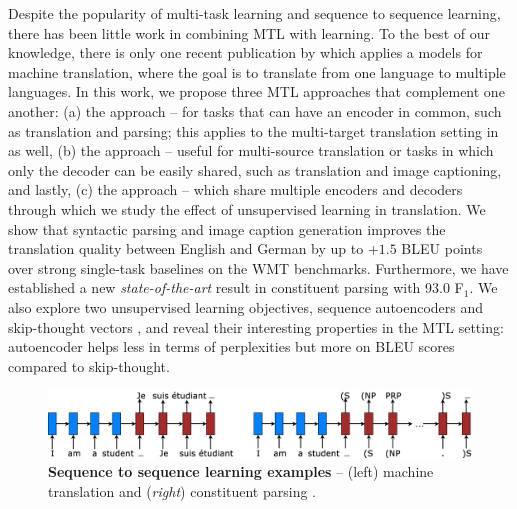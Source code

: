 Despite the popularity of multi-task learning and sequence to sequence
learning, there has been little work in combining MTL with \ssl{}
learning. To the best of our knowledge, there is only one recent
publication by  which applies a \ssl{} models for machine
translation, where the goal is to translate from one language to
multiple languages.
In this work, we propose three MTL
approaches that complement one another: (a) the {\it \otm} approach -- for
tasks that can have an encoder in common, such as translation and parsing; this 
applies to the multi-target translation setting in \cite{dong15} as well, (b)
the {\it \mto} approach -- useful for multi-source
translation or tasks in which only the decoder can be easily shared,
such as translation and image captioning, and lastly, (c) the {\it \mtm} approach -- which share
multiple encoders and decoders through which we study the effect of unsupervised
learning in translation.
We show
that syntactic parsing and image caption generation improves the
translation quality between English and German by up to +$1.5$ BLEU points over
strong single-task baselines on the WMT benchmarks. 
Furthermore, we have established a new {\it state-of-the-art} result in
constituent parsing with 93.0 F$_1$.
We also explore two unsupervised learning
objectives, sequence autoencoders \cite{dai15} and skip-thought vectors
\cite{kiros15skip}, and reveal their interesting properties in the MTL setting: autoencoder helps less in terms of
  perplexities but more on BLEU scores compared to skip-thought.
\begin{figure}%
\centering
\includegraphics[width=1\textwidth, clip=true, trim= 0 0 0
0]{img/6-1_seq2seq}
\caption[Sequence to sequence learning examples]{{\bf Sequence to sequence learning examples} -- (left) machine
translation \cite{sutskever14} and ({\it right}) constituent parsing
\cite{vinyals15grammar}.}
\label{f:s2s}
\end{figure}


